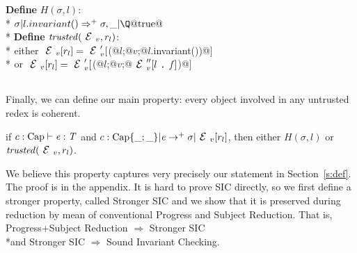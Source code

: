 \noindent\textbf{Define} $H(\sigma,l)$:\\*
${}_{}$\quad\quad$\sigma | l.invariant()\Rightarrow^+ \sigma,\_ | \text{\Q@true@}$\\*
\noindent\textbf{Define} $\mathit{trusted}(\ctx_v,r_l)$:\\*
${}_{}$\quad\quad either $\ctx_v[r_l]=\ctx_v'[$\Q@M(@$l$\Q@;@$v$\Q@;@$l$\Q@.invariant())@$]$\\*
${}_{}$\quad\quad or $\ctx_v[r_l]=\ctx_v'[$\Q@M(@$l$\Q@;@$v$\Q@;@$\ctx_v''[l\singleDot\f]$\Q@)@$]$

${}_{}$

\noindent Finally, we can define our main property: every object involved in any untrusted redex
is coherent.

\begin{Theorem}
if $c:\text{Cap}\vdash {\ensuremath{\mathit{e}}}: {\mathit{T}}$ and
$c:\text{Cap}\{\_;\_\}|\e\rightarrow^+ \sigma|\ctx_v[r_l]$, then
either $H(\sigma,l)$ or $\mathit{trusted}(\ctx_v,r_l)$.
\end{Theorem}

We believe this property captures very precisely our statement in Section~\ref{s:def}.
The proof is in the appendix. It is hard to prove SIC directly,
so we first define a stronger property,
called Stronger SIC and
we show that it is preserved during reduction by mean of conventional Progress and Subject Reduction.
That is,
Progress+Subject Reduction $\Rightarrow$ Stronger SIC
\\*and Stronger SIC $\Rightarrow$ Sound Invariant Checking.